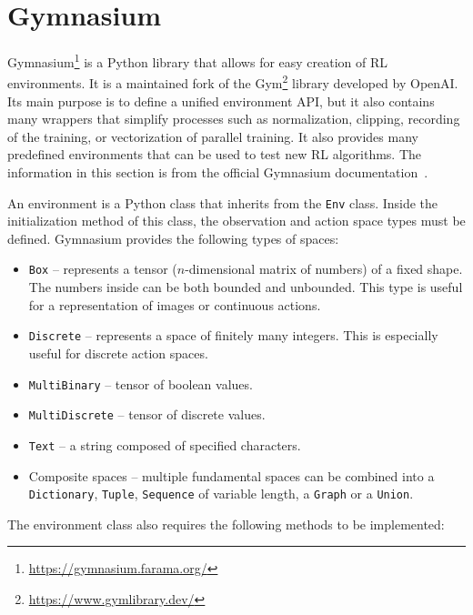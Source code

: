 \documentclass[
  digital,     %
  oneside,     %
  nosansbold,  %
  nocolorbold, %
  lof,         %
  lot,         %
]{fithesis4}
\begin{document}
\section{Gymnasium}
\label{sec:gym}
Gymnasium\footnote{\url{https://gymnasium.farama.org/}} is a Python library that allows for easy creation of RL environments. It is a maintained fork of the Gym\footnote{\url{https://www.gymlibrary.dev/}} library developed by OpenAI. Its main purpose is to define a unified environment API, but it also contains many wrappers that simplify processes such as normalization, clipping, recording of the training, or vectorization of parallel training. It also provides many predefined environments that can be used to test new RL algorithms. The information in this section is from the official Gymnasium documentation~\cite{gym-docs}.

An environment is a Python class that inherits from the \texttt{Env} class. Inside the initialization method of this class, the observation and action space types must be defined. Gymnasium provides the following types of spaces:

\begin{itemize}
    \item \texttt{Box} -- represents a tensor ($n$-dimensional matrix of numbers) of a fixed shape. The numbers inside can be both bounded and unbounded. This type is useful for a representation of images or continuous actions.
    \item \texttt{Discrete} -- represents a space of finitely many integers. This is especially useful for discrete action spaces.
    \item \texttt{MultiBinary} -- tensor of boolean values.
    \item \texttt{MultiDiscrete} -- tensor of discrete values. 
    \item \texttt{Text} -- a string composed of specified characters.
    \item Composite spaces -- multiple fundamental spaces can be combined into a \texttt{Dictionary}, \texttt{Tuple}, \texttt{Sequence} of variable length, a \texttt{Graph} or a \texttt{Union}.
\end{itemize}

The environment class also requires the following methods to be implemented:
\end{document}
